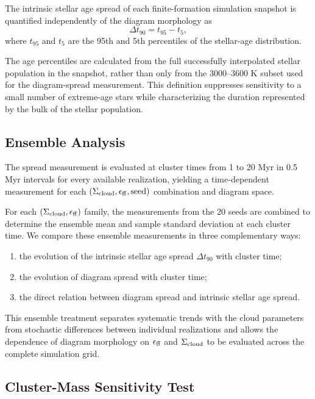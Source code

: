 \documentclass[linenumbers, twocolumn]{aastex631}
\begin{document}
The intrinsic stellar age spread of each finite-formation simulation snapshot is quantified independently of the diagram morphology as
\begin{equation}
\Delta t_{90}
=
t_{95}-t_5,
\end{equation}
where $t_{95}$ and $t_5$ are the 95th and 5th percentiles of the stellar-age distribution.

The age percentiles are calculated from the full successfully interpolated stellar population in the snapshot, rather than only from the 3000--3600 K subset used for the diagram-spread measurement. This definition suppresses sensitivity to a small number of extreme-age stars while characterizing the duration represented by the bulk of the stellar population.

\subsection{Ensemble Analysis}

The spread measurement is evaluated at cluster times from 1 to 20 Myr in 0.5 Myr intervals for every available realization, yielding a time-dependent measurement for each $(\Sigma_{\rm cloud},\epsilon_{\rm ff},{\rm seed})$ combination and diagram space.

For each $(\Sigma_{\rm cloud},\epsilon_{\rm ff})$ family, the measurements from the 20 seeds are combined to determine the ensemble mean and sample standard deviation at each cluster time. We compare these ensemble measurements in three complementary ways:

\begin{enumerate}
    \item the evolution of the intrinsic stellar age spread $\Delta t_{90}$ with cluster time;
    \item the evolution of diagram spread with cluster time;
    \item the direct relation between diagram spread and intrinsic stellar age spread.
\end{enumerate}

This ensemble treatment separates systematic trends with the cloud parameters from stochastic differences between individual realizations and allows the dependence of diagram morphology on $\epsilon_{\rm ff}$ and $\Sigma_{\rm cloud}$ to be evaluated across the complete simulation grid.

\subsection{Cluster-Mass Sensitivity Test}
\label{sec:mass-test}
\end{document}
